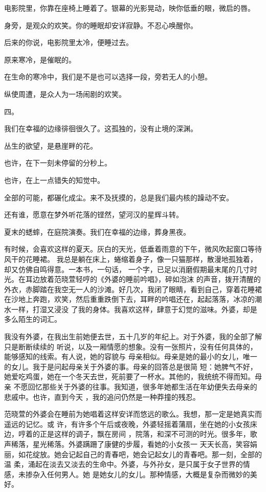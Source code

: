 \documentclass[12pt,a4paper]{article}
\newcommand{\subpart}[1]{
	\begingroup \par
	\vspace{1ex} \centering #1
	\par \endgroup
}
\begin{document}
		电影院里，你靠在座椅上睡着了。银幕的光影晃动，映你低垂的眼，微启的唇。\par
		身旁，是观众的欢笑。你的睡眠却安详寂静。不忍心唤醒你。\par
		后来的你说，电影院里太冷，便睡过去。\par
		原来寒冷，是催眠的。\par
		在生命的寒冷中，我们是不是也可以选择一段，旁若无人的小憩。\par
		纵使周遭，是众人为一场闹剧的欢笑。

		\subpart{四。}

		我们在幸福的边缘徘徊很久了。这孤独的，没有止境的深渊。

		丛生的欲望，是悬崖畔的花。\par
		也许，在下一刻未停留的分秒上。\par
		也许，在上一点错失的知觉中。\par
		全部的可能，都碾化成尘。来不及抚摸的，总是我们最内核的躁动不安。

		还有谁，愿意在梦外听花落的铿然，望河汉的星辉斗转。

		夏末的蟋蟀，在庭院演奏。我们在幸福的边缘，葬身黑夜。

	\endwriting



		有时候，会喜欢这样的夏天。灰白的天光，低垂着雨意的下午，微风吹起窗口等待风干的花睡裙。
	我总是躺在床上，蜷缩着身子，像一只猫那样，散漫地孤独着，却又仿佛自鸣得意。一本书，一句话，
	一个字，已足以消磨假期最末尾的几寸时光。在耳边放着范晓萱轻哼的《外婆的睡前吟唱》，碎如泡沫
	的声音，拨开清醒的外衣，赤脚踏在我空无一人的沙滩。好几次，我闭了眼睛，看到自己，穿着花睡裙
	在沙地上奔跑，欢笑，然后重重跌倒下去，耳畔的吟唱还在，起起落落，冰凉的潮水一样，打湿又浸没
	了我的身体。我喜欢这样，肆意于幻觉的滋味。外婆，却是多么陌生的词汇。

		我没有外婆，在我出生前她便去世，五十几岁的年纪上。对于外婆，我的全部了解只是断断续续的
	听说，以及一厢情愿的想象。没有一张照片，没有任何具体的，能够感知的线索。有人说，她的容貌与
	母亲相似。母亲是她的最小的女儿，唯一的女儿。我于是问起母亲关于外婆的事。母亲的回答总是很简
	短：她脾气不好，她爱吃鸡蛋，她在一个冬天去世，死前要了一杯水。其他的，我统统不得而知。母亲
	不愿回忆那些关于外婆的往事。我知道，很多年她都生活在年幼便失去母亲的悲戚中。也许，直到今天
	，我的追问仍然是一种莽撞的残忍。

		范晓萱的外婆会在睡前为她唱着这样安详而悠远的歌么。我想，那一定是她真实而遥远的记忆。或
	许，有许多个午后或夜晚，外婆轻摇着蒲扇，坐在她的小女孩床边，哼着的正是这样的调子，飘在房间
	，院落，和深不可测的时光。很多年，歌声稀落，星光稀落。外婆蹒跚了康健的步履，看她的小女孩一
	天天长高，笑容娟丽，如花绽放。她会记起自己的青春吧，她会记起女儿的青春吧。那一刻，全部的温
	柔，涌起在淡去又淡去的生命中。外婆，与外孙女，是只属于女子世界的情感，未掺杂入任何男人。她
	是她女儿的女儿。那种情感，大概是复杂而微妙的美好。
\end{document}

